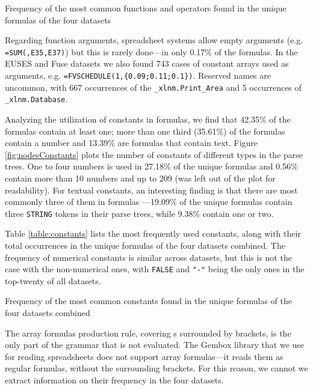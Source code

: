 \documentclass[times]{smrauth}
\begin{document}
\begin{table}[]
	\centering
	\caption{Frequency of the most common functions and operators found in the unique formulas of the four datasets}
	\label{table:functions}
	
\end{table}

Regarding function arguments, spreadsheet systems allow empty arguments (e.g. \texttt{=SUM(,E35,E37)}) but this is rarely done---in only 0.17\% of the formulas. In the EUSES and Fuse datasets we also found 743 cases of constant arrays used as arguments, e.g. \texttt{=FVSCHEDULE(1,\{0.09;0.11;0.1\})}. Reserved names are uncommon, with 667 occurrences of the \texttt{_xlnm.Print_Area} and 5 occurrences of \texttt{_xlnm.Database}.

Analyzing the utilization of constants in formulas, we find that 42.35\% of the formulas contain at least one; more than one third (35.61\%) of the formulas contain a number and 13.39\% are formulas that contain text. Figure \ref{fig:nodesConstants} plots the number of constants of different types in the parse trees. One to four numbers is used in 27.18\% of the unique formulas and 0.56\% contain more than 10 numbers and up to 209 (was left out of the plot for readability). For textual constants, an interesting finding is that there are most commonly three of them in formulas ---19.09\% of the unique formulas contain three \texttt{STRING} tokens in their parse trees, while 9.38\% contain one or two.

Table \ref{table:constants} lists the most frequently used constants, along with their total occurrences in the unique formulas of the four datasets combined. The frequency of numerical constants is similar across datasets, but this is not the case with the non-numerical ones, with \texttt{FALSE} and \texttt{"-"} being the only ones in the top-twenty of all datasets.

\begin{table}[]
	\centering
	\caption{Frequency of the most common constants found in the unique formulas of the four datasets combined}
	\label{table:constants}
	
\end{table}

The array formulas production rule, covering s surrounded by brackets, is the only part of the grammar that is not evaluated. The Gembox library that we use for reading spreadsheets does not support array formulas---it reads them as regular formulas, without the surrounding brackets. For this reason, we cannot we extract information on their frequency in the four datasets.
\end{document}
